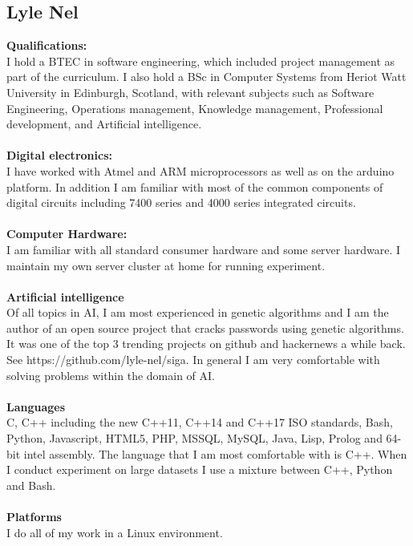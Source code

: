 \documentclass{article}
\begin{document}
\newpage
\subsection {Lyle Nel}
\textbf{Qualifications:} \\
I hold a BTEC in software engineering, which included project management as part of the curriculum.
I also hold a BSc in Computer Systems from Heriot Watt University in Edinburgh, Scotland, with relevant subjects such as Software Engineering, Operations management, Knowledge management, Professional development, and Artificial intelligence.\\ \\
\textbf{Digital electronics:} \\
I have worked with Atmel and ARM microprocessors as well as on the arduino platform. In addition I am familiar with most of the common components of digital circuits including 7400 series and 4000 series integrated circuits. \\ \\
\textbf{Computer Hardware:} \\
I am familiar with all standard consumer hardware and some server hardware. I maintain my own server cluster at home for running experiment. \\ \\
\textbf{Artificial intelligence} \\
Of all topics in AI, I am most experienced in genetic algorithms and I am the author of an open source project that cracks passwords using genetic algorithms. It was one of the top 3 trending projects on github and hackernews a while back. See https://github.com/lyle-nel/siga. In general I am very comfortable with solving problems within the domain of AI. \\ \\
\textbf{Languages} \\
C, C++ including the new C++11, C++14 and C++17 ISO standards, Bash, Python, Javascript, HTML5, PHP, MSSQL, MySQL, Java, Lisp, Prolog and 64-bit intel assembly. The language that I am most comfortable with is C++. When I conduct experiment on large datasets I use a mixture between C++, Python and Bash. \\ \\
\textbf{Platforms} \\
I do all of my work in a Linux environment.

\newpage
\end{document}
